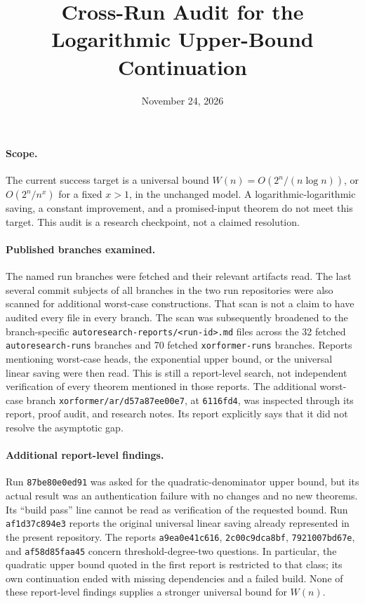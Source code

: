 \documentclass[11pt]{article}
\begin{document}
\title{Cross-Run Audit for the Logarithmic Upper-Bound Continuation}
\author{}
\date{November 24, 2026}
\maketitle

\paragraph{Scope.}
The current success target is a universal bound
$W(n)=O(2^n/(n\log n))$, or $O(2^n/n^x)$ for a fixed $x>1$,
in the unchanged model. A logarithmic-logarithmic saving, a constant
improvement, and a promised-input theorem do not meet this target.
This audit is a research checkpoint, not a claimed resolution.

\paragraph{Published branches examined.}
The named run branches were fetched and their relevant artifacts read.
The last several commit subjects of all branches in the two run
repositories were also scanned for additional worst-case constructions.
That scan is not a claim to have audited every file in every branch.
The scan was subsequently broadened to the branch-specific
\texttt{autoresearch-reports/<run-id>.md} files across the 32 fetched
\texttt{autoresearch-runs} branches and 70 fetched
\texttt{xorformer-runs} branches. Reports mentioning worst-case heads,
the exponential upper bound, or the universal linear saving were then
read. This is still a report-level search, not independent verification
of every theorem mentioned in those reports.
The additional worst-case branch
\texttt{xorformer/ar/d57a87ee00e7}, at \texttt{6116fd4}, was inspected
through its report, proof audit, and research notes. Its report explicitly
says that it did not resolve the asymptotic gap.

\paragraph{Additional report-level findings.}
Run \texttt{87be80e0ed91} was asked for the quadratic-denominator
upper bound, but its actual result was an authentication failure with
no changes and no new theorems. Its ``build pass'' line cannot be read
as verification of the requested bound. Run \texttt{af1d37c894e3}
reports the original universal linear saving already represented in
the present repository. The reports \texttt{a9ea0e41c616},
\texttt{2c00c9dca8bf}, \texttt{7921007bd67e}, and
\texttt{af58d85faa45} concern threshold-degree-two questions.
In particular, the quadratic upper bound quoted in the first report
is restricted to that class; its own continuation ended with missing
dependencies and a failed build. None of these report-level findings
supplies a stronger universal bound for $W(n)$.
\end{document}
